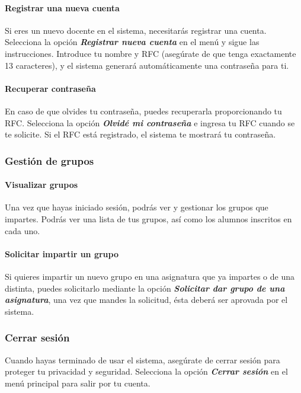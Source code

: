 \documentclass[a4paper,12pt]{article}
\begin{document}
\paragraph{Registrar una nueva cuenta}
Si eres un nuevo docente en el sistema, necesitarás registrar una cuenta. Selecciona la opción \textbf{\textit{Registrar nueva cuenta}} en el menú y sigue las instrucciones. Introduce tu nombre y RFC (asegúrate de que tenga exactamente 13 caracteres), y el sistema generará automáticamente una contraseña para ti.

\paragraph{Recuperar contraseña}
En caso de que olvides tu contraseña, puedes recuperarla proporcionando tu RFC. Selecciona la opción \textbf{\textit{Olvidé mi contraseña}} e ingresa tu RFC cuando se te solicite. Si el RFC está registrado, el sistema te mostrará tu contraseña.

\subsubsection{Gestión de grupos}

\paragraph{Visualizar grupos}
Una vez que hayas iniciado sesión, podrás ver y gestionar los grupos que impartes. Podrás ver una lista de tus grupos, así como los alumnos inscritos en cada uno.

\paragraph{Solicitar impartir un grupo}
Si quieres impartir un nuevo grupo en una asignatura que ya impartes o de una distinta, puedes solicitarlo mediante la opción \textit{\textbf{Solicitar dar grupo de una asignatura}}, una vez que mandes la solicitud, ésta deberá ser aprovada por el sistema.

\subsubsection{Cerrar sesión}
Cuando hayas terminado de usar el sistema, asegúrate de cerrar sesión para proteger tu privacidad y seguridad. Selecciona la opción \textit{\textbf{Cerrar sesión}} en el menú principal para salir por tu cuenta.
\end{document}
